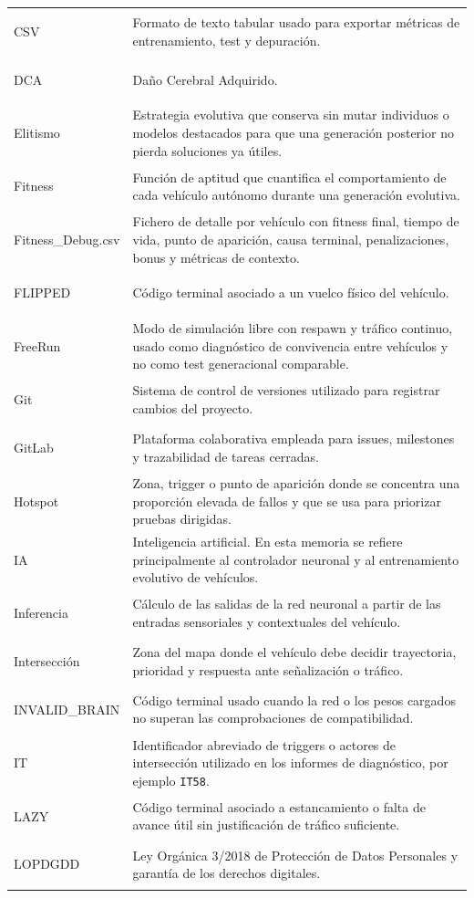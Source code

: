 \begin{longtable}{>{\bfseries\raggedright\arraybackslash}p{4.7cm}L{9.3cm}}
CSV & Formato de texto tabular usado para exportar métricas de entrenamiento, test y depuración.\\
DCA & Daño Cerebral Adquirido.\\
Elitismo & Estrategia evolutiva que conserva sin mutar individuos o modelos destacados para que una generación posterior no pierda soluciones ya útiles.\\
Fitness & Función de aptitud que cuantifica el comportamiento de cada vehículo autónomo durante una generación evolutiva.\\
Fitness\_Debug.csv & Fichero de detalle por vehículo con fitness final, tiempo de vida, punto de aparición, causa terminal, penalizaciones, bonus y métricas de contexto.\\
FLIPPED & Código terminal asociado a un vuelco físico del vehículo.\\
FreeRun & Modo de simulación libre con respawn y tráfico continuo, usado como diagnóstico de convivencia entre vehículos y no como test generacional comparable.\\
Git & Sistema de control de versiones utilizado para registrar cambios del proyecto.\\
GitLab & Plataforma colaborativa empleada para issues, milestones y trazabilidad de tareas cerradas.\\
Hotspot & Zona, trigger o punto de aparición donde se concentra una proporción elevada de fallos y que se usa para priorizar pruebas dirigidas.\\
IA & Inteligencia artificial. En esta memoria se refiere principalmente al controlador neuronal y al entrenamiento evolutivo de vehículos.\\
Inferencia & Cálculo de las salidas de la red neuronal a partir de las entradas sensoriales y contextuales del vehículo.\\
Intersección & Zona del mapa donde el vehículo debe decidir trayectoria, prioridad y respuesta ante señalización o tráfico.\\
INVALID\_BRAIN & Código terminal usado cuando la red o los pesos cargados no superan las comprobaciones de compatibilidad.\\
IT & Identificador abreviado de triggers o actores de intersección utilizado en los informes de diagnóstico, por ejemplo \texttt{IT58}.\\
LAZY & Código terminal asociado a estancamiento o falta de avance útil sin justificación de tráfico suficiente.\\
LOPDGDD & Ley Orgánica 3/2018 de Protección de Datos Personales y garantía de los derechos digitales.\\

\end{longtable}
